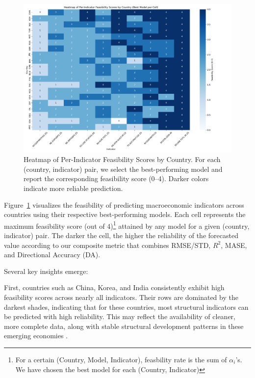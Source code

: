 \documentclass[12pt]{article}
\begin{document}
\begin{figure}[h]
    \centering
    \includegraphics[width=\textwidth]{figure8.png}
    \caption{Heatmap of Per-Indicator Feasibility Scores by Country. For each (country, indicator) pair, we select the best-performing model and report the corresponding feasibility score (0–4). Darker colors indicate more reliable prediction.}
    \label{fig:heatmap_feasibility}
\end{figure}


Figure~\ref{fig:heatmap_feasibility} visualizes the feasibility of predicting macroeconomic indicators across countries using their respective best-performing models. Each cell represents the maximum feasibility score (out of 4)\footnote{For a certain (Country, Model, Indicator), feasbility rate is the sum of $\alpha_i$'s. We have chosen the best model for each (Country, Indicator)} attained by any model for a given (country, indicator) pair. The darker the cell, the higher the reliability of the forecasted value according to our composite metric that combines RMSE/STD, $R^2$, MASE, and Directional Accuracy (DA).

Several key insights emerge:

First, countries such as China, Korea, and India consistently exhibit high feasibility scores across nearly all indicators. Their rows are dominated by the darkest shades, indicating that for these countries, most structural indicators can be predicted with high reliability. This may reflect the availability of cleaner, more complete data, along with stable structural development patterns in these emerging economies \cite{Chen2011development, OECD2019india}.
\end{document}
